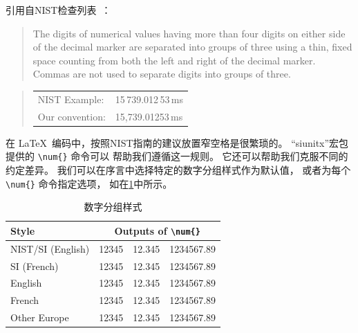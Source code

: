 引用自NIST检查列表~\cite[\#16]{NIST:UnitCheckList}：

\begin{quote}
  The digits of numerical values having more than four digits on either
  side of the decimal marker are separated into groups of three using
  a thin, fixed space counting from both the left and right of the decimal
  marker.
  Commas are not used to separate digits into groups of three.
\end{quote}

\begin{quote}
\begin{tabular}{ll}
  NIST Example:& 15\,739.012\,53\,ms\\
  Our convention:& 15,739.01253\,ms\\
\end{tabular}
\end{quote}

在 \LaTeX\ 编码中，按照NIST指南的建议放置窄空格是很繁琐的。
``siunitx''宏包提供的 \verb|\num{}| 命令可以
帮助我们遵循这一规则。
它还可以帮助我们克服不同的约定差异。
我们可以在序言中选择特定的数字分组样式作为默认值，
或者为每个 \verb|\num{}| 命令指定选项，
如在\cref{tab:app:styleguide:Digit-Grouping Style}中所示。

\newcommand{\NumDigitGrpA}{12 345}
\newcommand{\NumDigitGrpB}{12.345}
\newcommand{\NumDigitGrp}{1 234 567.89}
\begin{table}
\small\centering
\begin{tabular}{lrrr}\toprule
  Style & \multicolumn{3}{c}{Outputs of \texttt{\textbackslash num\{\}}} \\
  \midrule
  NIST/SI (English) & \num[group-separator={\,},group-digits=integer]{\NumDigitGrpA} &
    \num[group-separator={\,},group-digits=integer]{\NumDigitGrpB} &
      \num[group-separator={\,},group-digits=integer]{\NumDigitGrp} \\
  SI (French) & \num[locale=FR,group-separator={\,}]{\NumDigitGrpA} &
    \num[locale=FR,group-separator={\,}]{\NumDigitGrpB} &
      \num[locale=FR,group-separator={\,}]{\NumDigitGrp} \\
  English & \num[group-separator={,},group-digits=integer]{\NumDigitGrpA} &
    \num[group-separator={,},group-digits=integer]{\NumDigitGrpB} &
      \num[group-separator={,},group-digits=integer]{\NumDigitGrp} \\
  French & \num[locale=FR,group-separator={\,}]{\NumDigitGrpA} &
    \num[locale=FR,group-separator={\,}]{\NumDigitGrpB} &
      \num[locale=FR,group-separator={\,}]{\NumDigitGrp} \\
  Other Europe & \num[group-separator={.},output-decimal-marker={,},group-digits=integer]{\NumDigitGrpA} &
    \num[group-separator={.},output-decimal-marker={,},group-digits=integer]{\NumDigitGrpB} &
      \num[group-separator={.},output-decimal-marker={,},group-digits=integer]{\NumDigitGrp} \\
\bottomrule
\end{tabular}
\caption{数字分组样式}
\label{tab:app:styleguide:Digit-Grouping Style}
\end{table}

